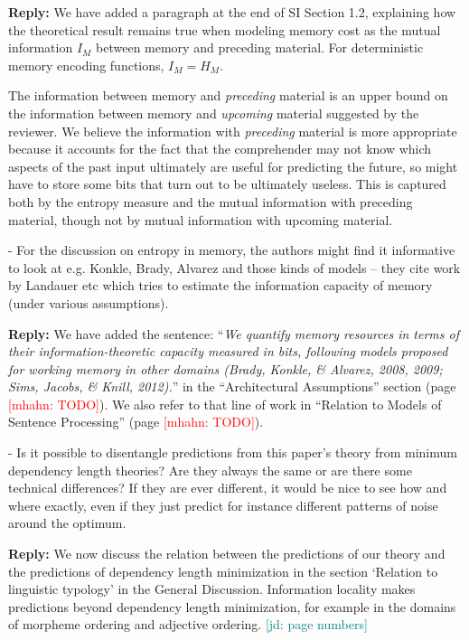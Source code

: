 \documentclass{article}[11pt,a4paper,oneside]
\newcommand\mhahn[1]{\textcolor{red}{[mhahn: #1]}}
\newcommand\jd[1]{\textcolor{teal}{[jd: #1]}}
\newenvironment{reply}
  {\par\medskip
   \color{blue}%
   \begin{framed}
   \textbf{Reply: }\ignorespaces}
 {\end{framed}
  \medskip}
\begin{document}
\begin{reply}
We have added a paragraph at the end of SI Section 1.2, explaining how the theoretical result remains true when modeling memory cost as the mutual information $I_M$ between memory and preceding material. For deterministic memory encoding functions, $I_M=H_M$.

	The information between memory and \emph{preceding} material is an upper bound on the information between memory and \emph{upcoming} material suggested by the reviewer.
	We believe the information with \emph{preceding} material is more appropriate because it accounts for the fact that the comprehender may not know which aspects of the past input ultimately are useful for predicting the future, so might have to store some bits that turn out to be ultimately useless. This is captured both by the entropy measure and the mutual information with preceding material, though not by mutual information with upcoming material. 
\end{reply}

- For the discussion on entropy in memory, the authors might find it informative to look at e.g. Konkle, Brady, Alvarez and those kinds of models -- they cite work by Landauer etc which tries to estimate the information capacity of memory (under various assumptions).

\begin{reply}
	We have added the sentence: ``\textit{We
quantify memory resources in terms of their information-theoretic capacity measured in
bits, following models proposed for working memory in other domains (Brady, Konkle, \&
	Alvarez, 2008, 2009; Sims, Jacobs, \& Knill, 2012).}'' in the ``Architectural Assumptions'' section (page \mhahn{TODO}).
	We also refer to that line of work in ``Relation to Models of Sentence Processing'' (page \mhahn{TODO}).
\end{reply}

- Is it possible to disentangle predictions from this paper's theory from minimum dependency length theories? Are they always the same or are there some technical differences? If they are ever different, it would be nice to see how and where exactly, even if they just predict for instance different patterns of noise around the optimum.


\begin{reply}
    We now discuss the relation between the predictions of our theory and the predictions of dependency length minimization in the section `Relation to linguistic typology' in the General Discussion. Information locality makes predictions beyond dependency length minimization, for example in the domains of morpheme ordering and adjective ordering.  \jd{page numbers}
\end{reply}
\end{document}
